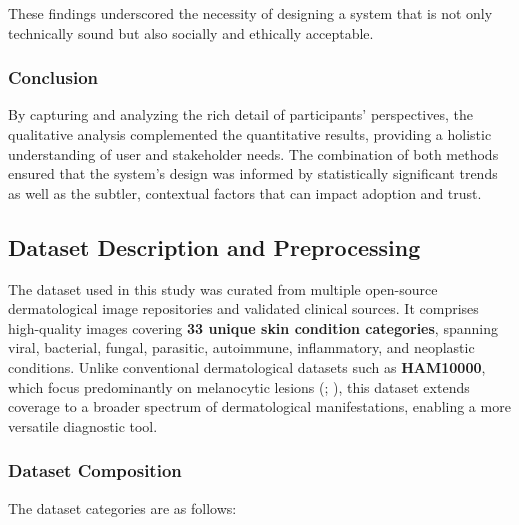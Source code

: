 \documentclass[
  12pt,
  oneside]{article}
\begin{document}
These findings underscored the necessity of designing a system that is
not only technically sound but also socially and ethically acceptable.

\subsubsection{Conclusion}\label{conclusion-1}

By capturing and analyzing the rich detail of participants'
perspectives, the qualitative analysis complemented the quantitative
results, providing a holistic understanding of user and stakeholder
needs. The combination of both methods ensured that the system's design
was informed by statistically significant trends as well as the subtler,
contextual factors that can impact adoption and trust.

\subsection{Dataset Description and
Preprocessing}\label{dataset-description-and-preprocessing}

The dataset used in this study was curated from multiple open-source
dermatological image repositories and validated clinical sources. It
comprises high-quality images covering \textbf{33 unique skin condition
categories}, spanning viral, bacterial, fungal, parasitic, autoimmune,
inflammatory, and neoplastic conditions. Unlike conventional
dermatological datasets such as \textbf{HAM10000}, which focus
predominantly on melanocytic lesions (; ), this dataset extends coverage to a broader spectrum of
dermatological manifestations, enabling a more versatile diagnostic
tool.

\subsubsection{Dataset Composition}\label{dataset-composition}

The dataset categories are as follows:
\end{document}
